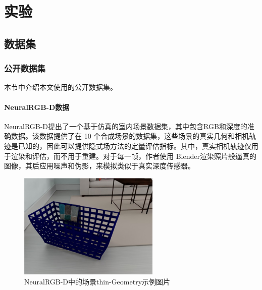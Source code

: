 \chapter{实验}

\section{数据集}
\subsection{公开数据集}
本节中介绍本文使用的公开数据集。
\subsubsection{NeuralRGB-D数据}
NeuralRGB-D\cite{azinovic_neural_2022}提出了一个基于仿真的室内场景数据集，其中包含RGB和深度的准确数据。该数据提供了在 10 个合成场景的数据集，这些场景的真实几何和相机轨迹是已知的，因此可以提供隐式场方法的定量评估指标。其中，真实相机轨迹仅用于渲染和评估，而不用于重建。对于每一帧，作者使用 Blender渲染照片般逼真的图像，其后应用噪声和伪影，来模拟类似于真实深度传感器\cite{zabatani_intel_2020, zhang_microsoft_2012}。

\begin{figure}[ht]
    \centering
    \includegraphics[width=0.6\textwidth]{undergraduate-thesis/images/experiments/neural-rgbd dataset.png}
    \caption{NeuralRGB-D\cite{azinovic_neural_2022}中的场景thin-Geometry示例图片}
    \label{fig:exp-neural-rgbd-data}
\end{figure}

